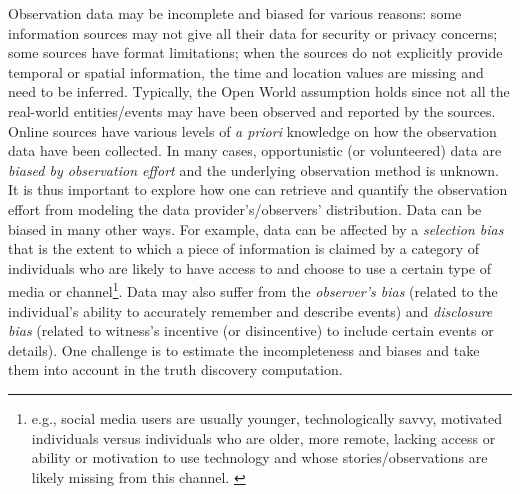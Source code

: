 \documentclass[prodmode,acmtecs]{acmsmall} %
\begin{document}
Observation data may be incomplete 
and biased for various reasons: 
 some information sources may not give all their data for security or privacy concerns; 
 some sources have format limitations; 
when the sources do not explicitly provide temporal or spatial information,
the time and location values are missing and need to be inferred. %
 Typically, the Open World assumption holds since  not all the real-world entities/events may have been observed and reported by the sources.
 Online sources have %
  various levels of {\it a priori} knowledge on how the observation data have been collected. In many cases, opportunistic (or volunteered) data are {\it biased by  observation effort} and the underlying observation method is unknown. It is thus important to explore how one can retrieve and quantify the observation effort from modeling the data provider's/observers' distribution. 
Data %
can be biased in many other ways. For example, data can be affected by a {\it selection bias} that is the extent to which a piece of information is claimed by a category of individuals who are likely to have access to and choose to use a certain type of media or channel\footnote{\scriptsize{e.g., social media users are usually younger, technologically savvy, motivated individuals versus individuals who are older, more remote, lacking access or ability or motivation to use technology and whose stories/observations are likely missing from this channel. }}. 
Data may also suffer from the {\it observer's bias} (related to the individual's ability to accurately remember and describe events) and {\it disclosure bias} (related to witness's incentive  (or disincentive) to  include certain events or details). One challenge is to estimate the incompleteness and biases and take them into account in the truth discovery computation.
\end{document}
